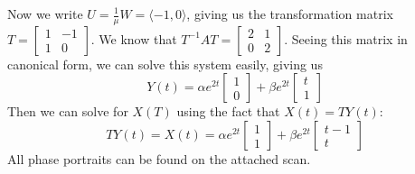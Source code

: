 \documentclass{article}
\theoremstyle{definition}
\begin{document}
Now we write $U = \frac{1}{\mu}W = \langle -1, 0 \rangle$, giving us the transformation matrix $T = \begin{bmatrix}
    1&-1\\1&0
\end{bmatrix}$.
We know that $T^{-1}AT = \begin{bmatrix}
    2&1\\0&2
\end{bmatrix}$.
Seeing this matrix in canonical form, we can solve this system easily, giving us 
\[
    Y(t) = \alpha e^{2 t} \begin{bmatrix}
        1\\0
    \end{bmatrix} + \beta e^{2 t}\begin{bmatrix}
        t\\1
    \end{bmatrix}
\]
Then we can solve for $X(T)$ using the fact that $X(t) = TY(t)$:
\[
    TY(t) = X(t) = \alpha e^{2t} \begin{bmatrix}
        1\\1
    \end{bmatrix} + \beta e^{2 t} \begin{bmatrix}
        t - 1\\t
    \end{bmatrix}
\]
All phase portraits can be found on the attached scan.
\end{document}
